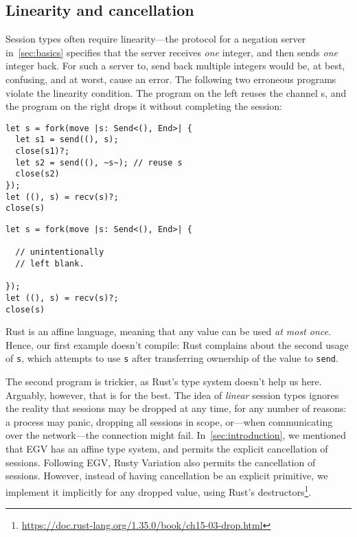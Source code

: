 \documentclass[copyright,creativecommons]{eptcs}
\begin{document}
\subsection{Linearity and cancellation}\label{sec:cancellation}
Session types often require linearity---the protocol for a negation server in~\cref{sec:basics} specifies that the server receives \emph{one} integer, and then sends \emph{one} integer back. For such a server to, \eg send back multiple integers would be, at best, confusing, and at worst, cause an error. The following two erroneous programs violate the linearity condition. The program on the left reuses the channel s, and the program on the right drops it without completing the session:

\vspace{-0.5\baselineskip}
\begin{minipage}[t]{0.5\linewidth}
\begin{lstlisting}
let s = fork(move |s: Send<(), End>| {
  let s1 = send((), s);
  close(s1)?;
  let s2 = send((), ~s~); // reuse s
  close(s2)
});
let ((), s) = recv(s)?;
close(s)
\end{lstlisting}
\end{minipage}%
\begin{minipage}[t]{0.5\linewidth}
\begin{lstlisting}
let s = fork(move |s: Send<(), End>| {
  
  // unintentionally
  // left blank.

});
let ((), s) = recv(s)?;
close(s)
\end{lstlisting}
\end{minipage}
\vspace{-0.25\baselineskip}

\noindent
Rust is an affine language, meaning that any value can be used \emph{at most once}. Hence, our first example doesn't compile: Rust complains about the second usage of \lstinline{s}, which attempts to use \lstinline{s} after transferring ownership of the value to \lstinline{send}.

The second program is trickier, as Rust's type system doesn't help us here. Arguably, however, that is for the best. The idea of \emph{linear} session types ignores the reality that sessions may be dropped at any time, for any number of reasons: a process may panic, dropping all sessions in scope, or---when communicating over the network---the connection might fail. In~\cref{sec:introduction}, we mentioned that EGV has an affine type system, and permits the explicit cancellation of sessions. Following EGV, Rusty Variation also permits the cancellation of sessions. However, instead of having cancellation be an explicit primitive, we implement it implicitly for any dropped value, using Rust's destructors\footnote{\url{https://doc.rust-lang.org/1.35.0/book/ch15-03-drop.html}}.
\end{document}
